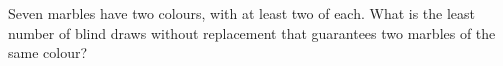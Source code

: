 Seven marbles have two colours, with at least two of each. What is the least number of blind draws without replacement that guarantees two marbles of the same colour?
